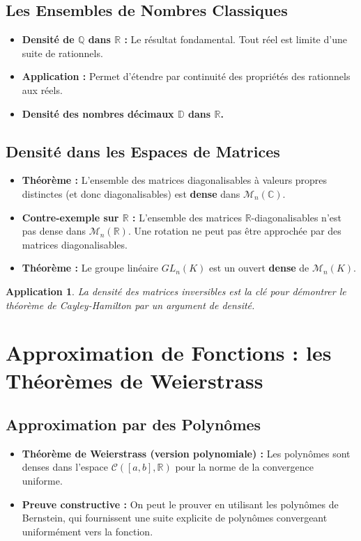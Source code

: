 \documentclass[12pt, a4paper, parskip=full]{report}
\theoremstyle{agregstyle}
\newtheorem{application}[definition]{Application}
\begin{document}
\subsection{Les Ensembles de Nombres Classiques}
\begin{itemize}
    \item \textbf{Densité de $\mathbb{Q}$ dans $\mathbb{R}$ :} Le résultat fondamental. Tout réel est limite d'une suite de rationnels.
    \item \textbf{Application :} Permet d'étendre par continuité des propriétés des rationnels aux réels.
    \item \textbf{Densité des nombres décimaux $\mathbb{D}$ dans $\mathbb{R}$.}
\end{itemize}

\subsection{Densité dans les Espaces de Matrices}
\begin{itemize}
    \item \textbf{Théorème :} L'ensemble des matrices diagonalisables à valeurs propres distinctes (et donc diagonalisables) est \textbf{dense} dans $\mathcal{M}_n(\mathbb{C})$.
    \item \textbf{Contre-exemple sur $\mathbb{R}$ :} L'ensemble des matrices $\mathbb{R}$-diagonalisables n'est pas dense dans $\mathcal{M}_n(\mathbb{R})$. Une rotation ne peut pas être approchée par des matrices diagonalisables.
    \item \textbf{Théorème :} Le groupe linéaire $GL_n(K)$ est un ouvert \textbf{dense} de $\mathcal{M}_n(K)$.
\end{itemize}
\begin{application}
    La densité des matrices inversibles est la clé pour démontrer le théorème de Cayley-Hamilton par un argument de densité.
\end{application}

\section{Approximation de Fonctions : les Théorèmes de Weierstrass}

\subsection{Approximation par des Polynômes}
\begin{itemize}
    \item \textbf{Théorème de Weierstrass (version polynomiale) :} Les polynômes sont denses dans l'espace $\mathcal{C}([a,b], \mathbb{R})$ pour la norme de la convergence uniforme.
    \item \textbf{Preuve constructive :} On peut le prouver en utilisant les polynômes de Bernstein, qui fournissent une suite explicite de polynômes convergeant uniformément vers la fonction.
\end{itemize}
\end{document}
